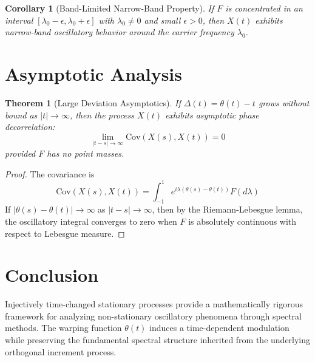 \documentclass[11pt]{article}
\newtheorem{theorem}{Theorem}
\newtheorem{corollary}{Corollary}
\begin{document}
\begin{corollary}[Band-Limited Narrow-Band Property]
If $F$ is concentrated in an interval $[\lambda_0 - \epsilon, \lambda_0 + \epsilon]$ with $\lambda_0 \neq 0$ and small $\epsilon > 0$, then $X(t)$ exhibits narrow-band oscillatory behavior around the carrier frequency $\lambda_0$.
\end{corollary}

\section{Asymptotic Analysis}

\begin{theorem}[Large Deviation Asymptotics]
If $\Delta(t) = \theta(t) - t$ grows without bound as $|t| \to \infty$, then the process $X(t)$ exhibits asymptotic phase decorrelation:
\begin{equation}
\lim_{|t-s| \to \infty} \text{Cov}(X(s),X(t)) = 0
\end{equation}
provided $F$ has no point masses.
\end{theorem}

\begin{proof}
The covariance is
\begin{equation}
\text{Cov}(X(s),X(t)) = \int_{-1}^1 e^{i\lambda(\theta(s)-\theta(t))} F(d\lambda)
\end{equation}
If $|\theta(s) - \theta(t)| \to \infty$ as $|t-s| \to \infty$, then by the Riemann-Lebesgue lemma, the oscillatory integral converges to zero when $F$ is absolutely continuous with respect to Lebesgue measure.
\end{proof}

\section{Conclusion}

Injectively time-changed stationary processes provide a mathematically rigorous framework for analyzing non-stationary oscillatory phenomena through spectral methods. The warping function $\theta(t)$ induces a time-dependent modulation while preserving the fundamental spectral structure inherited from the underlying orthogonal increment process.
\end{document}
